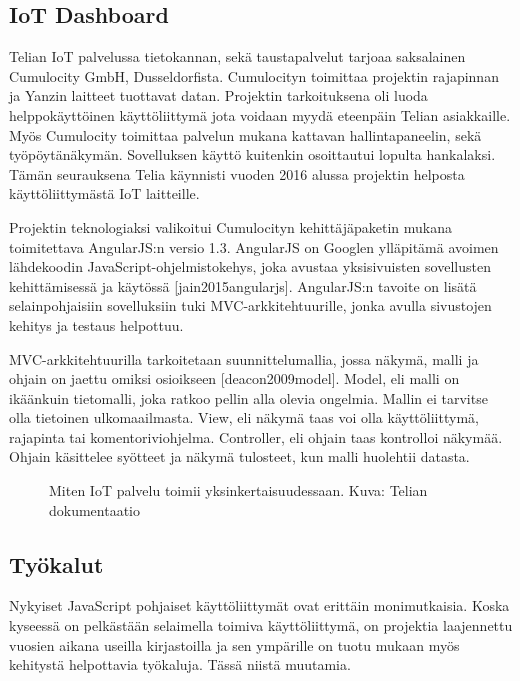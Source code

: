 \documentclass{tktltiki}
\begin{document}
\subsection{IoT Dashboard}

Telian IoT palvelussa tietokannan, sekä taustapalvelut tarjoaa saksalainen Cumulocity GmbH, Dusseldorfista. Cumulocityn toimittaa projektin rajapinnan ja Yanzin laitteet tuottavat datan. Projektin tarkoituksena oli luoda helppokäyttöinen käyttöliittymä jota voidaan myydä eteenpäin Telian asiakkaille. Myös Cumulocity toimittaa palvelun mukana kattavan hallintapaneelin, sekä työpöytänäkymän. Sovelluksen käyttö kuitenkin osoittautui lopulta hankalaksi. Tämän seurauksena Telia käynnisti vuoden 2016 alussa projektin helposta käyttöliittymästä IoT laitteille. 

Projektin teknologiaksi valikoitui Cumulocityn kehittäjäpaketin mukana toimitettava AngularJS:n versio 1.3. AngularJS on Googlen ylläpitämä avoimen lähdekoodin JavaScript-ohjelmistokehys, joka avustaa yksisivuisten sovellusten kehittämisessä ja käytössä [jain2015angularjs]. AngularJS:n tavoite on lisätä selainpohjaisiin sovelluksiin tuki MVC-arkkitehtuurille, jonka avulla sivustojen kehitys ja testaus helpottuu. 

MVC-arkkitehtuurilla tarkoitetaan suunnittelumallia, jossa näkymä, malli ja ohjain on jaettu omiksi osioikseen [deacon2009model]. Model, eli malli on ikäänkuin tietomalli, joka ratkoo pellin alla olevia ongelmia. Mallin ei tarvitse olla tietoinen ulkomaailmasta. View, eli näkymä taas voi olla käyttöliittymä, rajapinta tai komentoriviohjelma. Controller, eli ohjain taas kontrolloi näkymää. Ohjain käsittelee syötteet ja näkymä tulosteet, kun malli huolehtii datasta. 

\begin{figure}[h]
\begin{center}
\caption{Miten IoT palvelu toimii yksinkertaisuudessaan. Kuva: Telian dokumentaatio}
\label{IoT arkkitehtuuri}
\end{center}
\end{figure}

\subsection{Työkalut}

Nykyiset JavaScript pohjaiset käyttöliittymät ovat erittäin monimutkaisia. Koska kyseessä on pelkästään selaimella toimiva käyttöliittymä, on projektia laajennettu vuosien aikana useilla kirjastoilla ja sen ympärille on tuotu mukaan myös kehitystä helpottavia työkaluja. Tässä niistä muutamia. 
\end{document}
